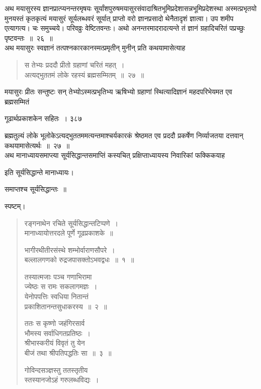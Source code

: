 \documentclass[11pt, openany]{book}
\begin{document}
 अथ मयासुरस्य ज्ञानप्रात्प्यनन्तरमृषयः सूर्यांशपुरुषमयासुरसंवादाश्रितभूमिप्रदेशासन्नभूमिप्रदेशस्था अस्मत्प्रभृतयो मुनयस्तं कृतकृत्यं मयासुरं सूर्यलब्धवरं सूर्यात् प्राप्तो वरो ज्ञानप्रसादो थेनैतादृशं ज्ञात्वा। उप शमीप एत्यागत्य। चः समुच्चये। परिवव्रुः वेष्टितवन्तः। अथो अनन्तरमादरादत्यन्ते  तं ज्ञानं ग्रहादिचरितं पप्रच्छुः पृष्टवन्तः~॥~२६~॥\\
 \noindent अथ मयासुरः स्वज्ञानं तत्पश्नकारकानस्मत्प्रमृतीन् मुनीन् प्रति कथयामासेत्याह\textendash


\begin{quote}
 {\ssi स तेभ्यः प्रददौ प्रीतो ग्रहाणां चरितं महत्~।\\
अत्यद्भुततमं लोके रहस्यं ब्रह्मसम्मितम्~॥~२७~॥ }
\end{quote}

 मयासुरः प्रीतः सन्तुष्टः सन् तेभ्योऽस्मत्प्रभृतिभ्य ऋषिभ्यो ग्रहाणां स्थित्यादिज्ञानं महदपरिभेयमत एव ब्रह्मसम्मितं



\newpage


\hspace{3cm} गूढार्थप्रकाशकेन सहितः~। \hfill ३८७
\vspace{1cm}


\noindent ब्रह्मतुल्यं लोके भूलोकेऽत्यद्भुततममत्यन्तमाश्चर्यकारकं श्रेष्ठमत एव प्रददौ प्रकर्षेण निर्व्याजतया दत्तवान् कथयामासेत्यर्थः~॥~२७~॥\\
अथ मानाध्यायसमाप्त्या सूर्यसिद्धान्तसमाप्तिं कस्यचित् प्रक्षिप्ताध्यायस्य निवारिकां फक्किकयाह\textendash 

\begin{center}
  इति सूर्यसिद्धान्ते मानाध्यायः। 

 समाप्तश्च सूर्यसिद्धान्तः~॥ 
\end{center}

\noindent स्पष्टम्। 


\begin{quote}
 {\qt रङ्गनाथेन रचिते सूर्यसिद्धान्तटिप्पणे~।\\
मानाध्यायोत्तरदले पूर्णे गूढप्रकाशके~॥

भागीरथीतीरसंस्थे शम्भोर्वाराणसौपरे~।\\
बल्लालगणको रुद्रजपासक्तोऽभवद्वधः~॥~१~॥

तस्यात्मजाः पञ्च गणाभिरामा\\
ज्येष्ठः स रामः सकलागमज्ञः~।\\
येनोपपत्तिः स्वधिया नितान्तं\\
प्रकाशितानन्तसुधाकरस्य~॥~२~॥

ततः स कृष्णो जहंगिरसार्व\textendash \\
भौमस्य सर्वाधिगतप्रतिष्ठः~।\\
श्रीभास्करीयं विवृतं तु येन\\
बीजं तथा श्रीपतिपद्धतिः सा~॥~३~॥

गोविन्दसञ्ज्ञस्तु ततस्तृतीय\textendash \\
स्तस्यानजोऽहं गरुलब्धविद्यः~।}
\end{quote}
\end{document}
